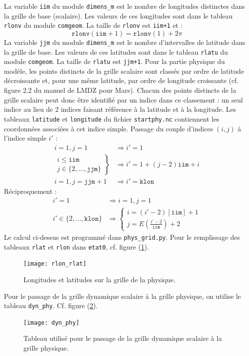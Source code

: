 \documentclass[a4paper,english,french]{article}
\begin{document}
La variable \verb+iim+ du module \verb+dimens_m+ est le nombre de
longitudes distinctes dans la grille de base (scalaire). Les valeurs
de ces longitudes sont dans le tableau \verb+rlonv+ du module
\verb+comgeom+. La taille de \verb+rlonv+ est \verb-iim+1- et :
\begin{equation*}
  \mathtt{rlonv}(\mathtt{iim}+1) = \mathtt{rlonv}(1) + 2 \pi
\end{equation*}
La variable \verb+jjm+ du module \verb+dimens_m+ est le nombre
d'intervalles de latitude dans la grille de base. Les valeurs de ces
latitudes sont dans le tableau \verb+rlatu+ du module \verb+comgeom+.
La taille de \verb+rlatu+ est \verb-jjm+1-.  Pour la partie physique
du modèle, les points distincts de la grille scalaire sont classés par
ordre de latitude décroissante et, pour une même latitude, par ordre
de longitude croissante (cf.  figure 2.2 du manuel de LMDZ pour Mars).
Chacun des points distincts de la grille scalaire peut donc être
identifié par un indice dans ce classement : un seul indice au lieu de
2 indices faisant référence à la latitude et à la longitude. Les
tableaux \verb+latitude+ et \verb+longitude+ du fichier
\verb+startphy.nc+ contiennent les coordonnées associées à cet indice
simple. Passage du couple d'indices $(i, j)$ à l'indice simple $i'$ :
\begin{align*}
  i = 1, j = 1 & \Rightarrow i' = 1 \\
  \left.
    \begin{array}{l}
      i \le \mathtt{iim} \\
      j \in \{2, \ldots, \mathtt{jjm}\}
    \end{array}
  \right\} & \Rightarrow i' = 1 + (j - 2) \mathtt{iim} + i \\
  i = 1, j = \mathtt{jjm} + 1 & \Rightarrow i' = \mathtt{klon}
\end{align*}
Réciproquement :
\begin{align*}
  i' = 1 & \Rightarrow i = 1, j = 1 \\
  i' \in \{2, \ldots, \mathtt{klon}\} & \Rightarrow
  \left\{
    \begin{array}{l}
      i = (i' - 2) [\mathtt{iim}] + 1 \\
      j = E\left(\frac{i' - 2}{\mathtt{iim}} \right) + 2
    \end{array}
  \right.
\end{align*}
Le calcul ci-dessus est programmé dans \verb+phys_grid.py+. Pour le
remplissage des tableaux \verb+rlat+ et \verb+rlon+ dans \verb+etat0+,
cf. figure (\ref{fig:rlon_rlat}).
\begin{figure}
  \centering
  \texttt{[image: rlon\_rlat]}
  \caption{Longitudes et latitudes sur la grille de la physique.}
  \label{fig:rlon_rlat}
\end{figure}
Pour le passage de la grille dynamique scalaire à la grille physique,
on utilise le tableau \verb+dyn_phy+. Cf. figure (\ref{fig:dyn_phy}).
\begin{figure}
  \centering
  \texttt{[image: dyn\_phy]}
  \caption[Grille dynamique scalaire à grille physique]{Tableau
    utilisé pour le passage de la grille dynamique scalaire à la
    grille physique.}
  \label{fig:dyn_phy}
\end{figure}
\end{document}
